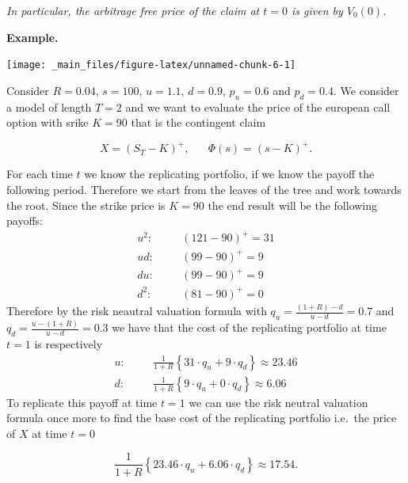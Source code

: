 \documentclass[
]{book}
\begin{document}
\emph{In particular, the arbitrage free price of the claim at \(t=0\) is given by \(V_0(0)\).}

\textbf{Example.}

\begin{center}\texttt{[image: \_main\_files/figure-latex/unnamed-chunk-6-1]} \end{center}

Consider \(R=0.04\), \(s=100\), \(u=1.1\), \(d=0.9\), \(p_u=0.6\) and \(p_d=0.4\). We consider a model of length \(T=2\) and we want to evaluate the price of the european call option with srike \(K=90\) that is the contingent claim

\[
X=(S_T-K)^+,\hspace{20pt}\Phi(s)=(s-K)^+.
\]

For each time \(t\) we know the replicating portfolio, if we know the payoff the following period. Therefore we start from the leaves of the tree and work towards the root. Since the strike price is \(K=90\) the end result will be the following payoffs:
\begin{align*}
u^2:\hspace{20pt}&(121-90)^+=31\\
ud:\hspace{20pt}&(99-90)^+=9\\
du:\hspace{20pt}&(99-90)^+=9\\
d^2:\hspace{20pt}&(81-90)^+=0
\end{align*}
Therefore by the risk neautral valuation formula with \(q_u=\frac{(1+R)-d}{u-d}=0.7\) and \(q_d=\frac{u-(1+R)}{u-d}=0.3\) we have that the cost of the replicating portfolio at time \(t=1\) is respectively
\begin{align*}
u:\hspace{20pt}&\frac{1}{1+R}\left\{31\cdot q_u + 9 \cdot q_d\right\}\approx 23.46\\
d:\hspace{20pt}&\frac{1}{1+R}\left\{9\cdot q_u + 0 \cdot q_d\right\}\approx 6.06
\end{align*}
To replicate this payoff at time \(t=1\) we can use the risk neutral valuation formula once more to find the base cost of the replicating portfolio i.e.~the price of \(X\) at time \(t=0\)

\[
\frac{1}{1+R}\left\{23.46\cdot q_u + 6.06 \cdot q_d\right\}\approx 17.54.
\]
\end{document}
